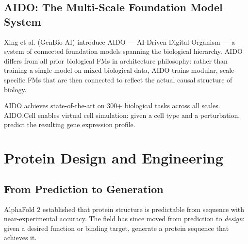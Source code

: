 \documentclass[11pt]{article}
\begin{document}
\subsection{AIDO: The Multi-Scale Foundation Model System}

Xing et al. \citep{xing2025aido} (GenBio AI) introduce AIDO --- AI-Driven Digital Organism --- a system of connected foundation models spanning the biological hierarchy. AIDO differs from all prior biological FMs in architecture philosophy: rather than training a single model on mixed biological data, AIDO trains modular, scale-specific FMs that are then connected to reflect the actual causal structure of biology.

\begin{center}
\end{center}

AIDO achieves state-of-the-art on 300+ biological tasks across all scales. AIDO.Cell enables virtual cell simulation: given a cell type and a perturbation, predict the resulting gene expression profile.

\section{Protein Design and Engineering}

\subsection{From Prediction to Generation}

AlphaFold 2 \citep{jumper2021highly} established that protein structure is predictable from sequence with near-experimental accuracy. The field has since moved from prediction to \emph{design}: given a desired function or binding target, generate a protein sequence that achieves it.
\end{document}
